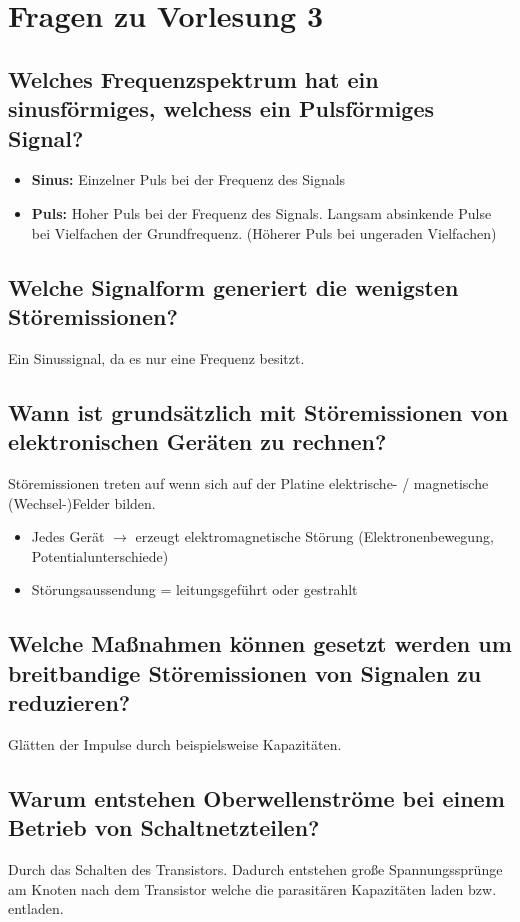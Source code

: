 \section{Fragen zu Vorlesung 3}

\subsection{Welches Frequenzspektrum hat ein sinusförmiges, welchess ein Pulsförmiges Signal?}
\begin{itemize}
  \item \textbf{Sinus:} Einzelner Puls bei der Frequenz des Signals
  \item \textbf{Puls:} Hoher Puls bei der Frequenz des Signals. Langsam absinkende Pulse bei Vielfachen der Grundfrequenz. (Höherer Puls bei ungeraden Vielfachen)
\end{itemize}

\subsection{Welche Signalform generiert die wenigsten Störemissionen?}
Ein Sinussignal, da es nur eine Frequenz besitzt.

\subsection{Wann ist grundsätzlich mit Störemissionen von elektronischen Geräten zu rechnen?}
Störemissionen treten auf wenn sich auf der Platine elektrische- / magnetische (Wechsel-)Felder bilden.

\begin{itemize}
  \item Jedes Gerät \(\rightarrow\) erzeugt elektromagnetische Störung (Elektronenbewegung, Potentialunterschiede)
  \item Störungsaussendung = leitungsgeführt oder gestrahlt
\end{itemize}

\subsection{Welche Maßnahmen können gesetzt werden um breitbandige Störemissionen von Signalen zu reduzieren?}
Glätten der Impulse durch beispielsweise Kapazitäten.

\subsection{Warum entstehen Oberwellenströme bei einem Betrieb von Schaltnetzteilen?}
Durch das Schalten des Transistors. Dadurch entstehen große Spannungssprünge am Knoten nach dem Transistor welche die parasitären Kapazitäten laden bzw. entladen.

